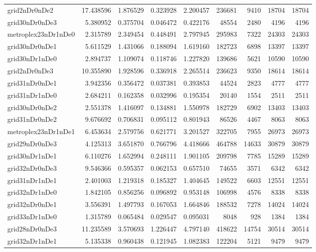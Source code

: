 \documentclass[../../../thesis.tex]{subfiles}
\begin{document}
\begin{longtable}{|l|r|r|r|r|r|r|r|r|}
grid2nDr0nDe2 & 17.438596 & 1.876529 & 0.323928 & 2.200457 & 236681 & 9410 & 18704 & 18704 \\
grid30nDr0nDe3 & 5.380952 & 0.375704 & 0.046472 & 0.422176 & 48554 & 2480 & 4196 & 4196 \\
metroplex23nDr1nDe0 & 2.315789 & 2.349454 & 0.448491 & 2.797945 & 295983 & 7322 & 24303 & 24303 \\
grid30nDr0nDe1 & 5.611529 & 1.431066 & 0.188094 & 1.619160 & 182723 & 6898 & 13397 & 13397 \\
grid30nDr1nDe0 & 2.894737 & 1.109074 & 0.118746 & 1.227820 & 139686 & 5621 & 10590 & 10590 \\
grid2nDr0nDe3 & 10.355890 & 1.928596 & 0.336918 & 2.265514 & 236623 & 9350 & 18614 & 18614 \\
grid31nDr0nDe1 & 3.942356 & 0.356472 & 0.037381 & 0.393853 & 44524 & 2823 & 4777 & 4777 \\
grid31nDr1nDe0 & 2.684211 & 0.162358 & 0.032996 & 0.195354 & 20140 & 1554 & 2511 & 2511 \\
grid30nDr0nDe2 & 2.551378 & 1.416097 & 0.134881 & 1.550978 & 182729 & 6902 & 13403 & 13403 \\
grid31nDr0nDe2 & 9.676692 & 0.706831 & 0.095112 & 0.801943 & 86526 & 4467 & 8063 & 8063 \\
metroplex23nDr1nDe1 & 6.453634 & 2.579756 & 0.621771 & 3.201527 & 322705 & 7955 & 26973 & 26973 \\
grid29nDr0nDe3 & 4.125313 & 3.651870 & 0.766796 & 4.418666 & 464788 & 14633 & 30879 & 30879 \\
grid30nDr1nDe1 & 6.110276 & 1.652994 & 0.248111 & 1.901105 & 209798 & 7785 & 15289 & 15289 \\
grid32nDr0nDe3 & 9.546366 & 0.595357 & 0.062153 & 0.657510 & 74655 & 3571 & 6342 & 6342 \\
grid31nDr1nDe1 & 2.401003 & 1.219318 & 0.185327 & 1.404645 & 149522 & 6603 & 12551 & 12551 \\
grid32nDr1nDe0 & 1.842105 & 0.856256 & 0.096892 & 0.953148 & 106998 & 4576 & 8338 & 8338 \\
grid32nDr0nDe1 & 3.556391 & 1.497793 & 0.167053 & 1.664846 & 188532 & 7278 & 14024 & 14024 \\
grid33nDr1nDe0 & 1.315789 & 0.065484 & 0.029547 & 0.095031 & 8048 & 928 & 1384 & 1384 \\
grid28nDr0nDe3 & 11.235589 & 3.570693 & 1.226447 & 4.797140 & 418622 & 14754 & 30514 & 30514 \\
grid32nDr1nDe1 & 5.135338 & 0.960438 & 0.121945 & 1.082383 & 122204 & 5121 & 9479 & 9479 \\

\end{longtable}
\end{document}
